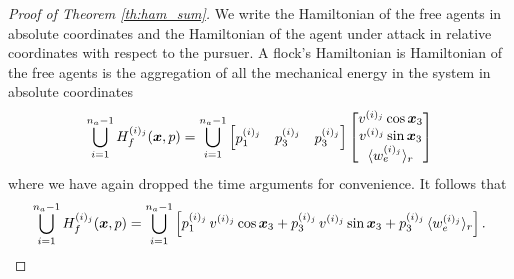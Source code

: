 \begin{proof}[Proof of Theorem \ref{th:ham_sum}]
We write the Hamiltonian of the free agents in absolute coordinates and the Hamiltonian of the agent under attack in relative coordinates with respect to the pursuer. A flock's Hamiltonian is  Hamiltonian of the free agents is the aggregation of all the mechanical energy in the system in absolute coordinates \ie %
%
\begin{align}
	\bigcup_{i=1}^{n_a-1} H^{(i)_j}_f(\bm{x}, p) = \bigcup_{i=1}^{n_a-1} \begin{bmatrix}
		p_1^{(i)_j} & p_3^{(i)_j} & p_3^{(i)_j}
	\end{bmatrix} 
	\begin{bmatrix}
		v^{(i)_j} \cos \bm{x}_3 \\ v^{(i)_j} \sin \bm{x}_3 \\ \langle w_e^{(i)_j}\rangle_r
	\end{bmatrix}
\end{align}
%
where we have again dropped the time arguments for convenience. It follows that
%
\begin{align}
	\bigcup_{i=1}^{n_a-1} H^{(i)_j}_f(\bm{x}, p) = \bigcup_{i=1}^{n_a-1} 
		\left[p_1^{(i)_j} \, v^{(i)_j} \cos \bm{x}_3 + p_3^{(i)_j} \, v^{(i)_j} \sin \bm{x}_3 + p_3^{(i)_j}\, \langle w_e^{(i)_j}\rangle_r\right].
\end{align}


\end{proof}
